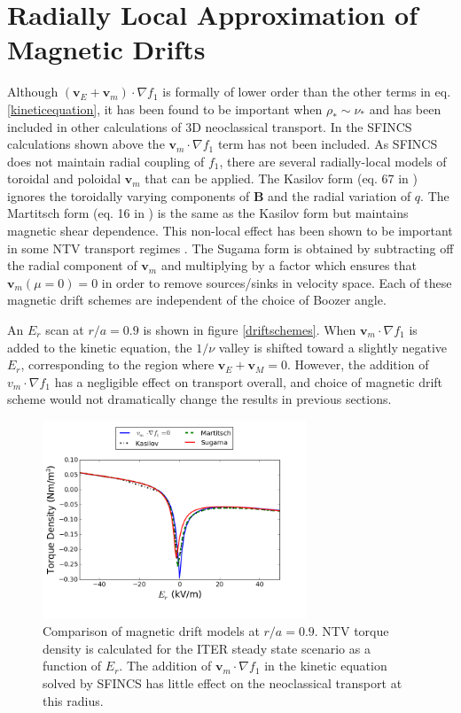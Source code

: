 \documentclass{article}
\begin{document}
\FloatBarrier

\section{Radially Local Approximation of Magnetic Drifts}\label{mds}
Although $(\bm{v}_E + \bm{v}_m) \cdot \nabla f_1$ is formally of lower order than the other terms in eq. \ref{kineticequation}, it has been found to be important when $\rho_* \sim \nu_*$ and has been included in other calculations of 3D neoclassical transport. In the SFINCS calculations shown above the $\bm{v}_m \cdot \nabla f_1$ term has not been included. As SFINCS does not maintain radial coupling of $f_1$, there are several radially-local models of toroidal and poloidal $\bm{v}_m$ that can be applied.  The Kasilov form (eq. 67 in \cite{Kasilov2014}) ignores the toroidally varying components of $\bm{B}$ and the radial variation of $q$. The Martitsch form (eq. 16 in \cite{Martitsch2016}) is the same as the Kasilov form but maintains magnetic shear dependence. This non-local effect has been shown to be important in some NTV transport regimes \cite{Martitsch2016}. The Sugama form is obtained by subtracting off the radial component of $\bm{v}_m$ and multiplying by a factor which ensures that $\bm{v}_m (\mu = 0)  = 0$ in order to remove sources/sinks in velocity space. Each of these magnetic drift schemes are independent of the choice of Boozer angle. 

An $E_r$ scan at $r/a = 0.9$ is shown in figure \ref{driftschemes}. When $\bm{v}_m \cdot \nabla f_1$ is added to the kinetic equation, the $1/\nu$ valley is shifted toward a slightly negative $E_r$, corresponding to the region where $\bm{v}_E + \bm{v}_M = 0$. However, the addition of $v_m \cdot \nabla f_1$ has a negligible effect on transport overall, and choice of magnetic drift scheme would not dramatically change the results in previous sections.  

\begin{figure}[h!]
\centering
\includegraphics[width=0.7\textwidth]{mdscomparison.png}
\caption{Comparison of magnetic drift models at $r/a = 0.9$. NTV torque density is calculated for the ITER steady state scenario as a function of $E_r$. The addition of $\bm{v}_m \cdot \nabla f_1$ in the kinetic equation solved by SFINCS has little effect on the neoclassical transport at this radius. }
\end{figure}\label{driftschemes}
\end{document}
